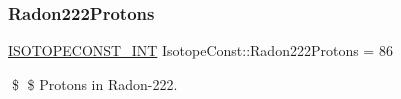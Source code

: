 \subsubsection{\texorpdfstring{Radon222\+Protons}{Radon222Protons}}
{\footnotesize\ttfamily \mbox{\hyperlink{group___isotope_const-_macros_ga5f18360b3e99483a35c32d789e62621c}{I\+S\+O\+T\+O\+P\+E\+C\+O\+N\+S\+T\+\_\+\+I\+NT}} Isotope\+Const\+::\+Radon222\+Protons = 86}

\$ \$ Protons in Radon-\/222. 